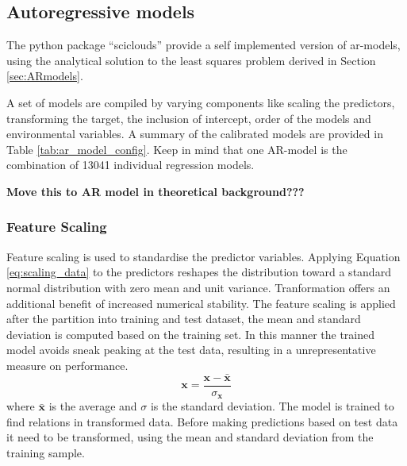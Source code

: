 \subsection{Autoregressive models}
The python package ``sciclouds'' provide a self implemented version of \acrshort{ar}-models, using the analytical solution to the least squares problem derived in Section \ref{sec:ARmodels}. %

A set of models are compiled by varying components like scaling the predictors, transforming the target, the inclusion of intercept, order of the models and environmental variables. A summary of the calibrated models are provided in Table \ref{tab:ar_model_config}. Keep in mind that one AR-model is the combination of 13041 individual regression models.  

\textbf{Move this to AR model in theoretical background???}
\subsubsection{Feature Scaling} \label{sec:scaling_predictors}

Feature scaling is used to standardise the predictor variables.
Applying Equation \ref{eq:scaling_data} to the predictors reshapes the distribution toward a standard normal distribution with zero mean and unit variance. 
Tranformation offers an additional benefit of increased numerical stability. %
The feature scaling is applied after the partition into training and test dataset, the mean and standard deviation is computed based on the training set. In this manner the trained model avoids sneak peaking at the test data, resulting in a unrepresentative measure on performance.
\begin{equation} \label{eq:scaling_data}
    \mathbf{x} = \frac{\mathbf{x} - \bar{\mathbf{x}}}{\sigma_{\mathbf{x}}}
\end{equation}
where $\bar{\mathbf{x}}$ is the average and $\sigma$ is the standard deviation. The model is trained to find relations in transformed data. Before making predictions based on test data it need to be transformed, using the mean and standard deviation from the training sample.

